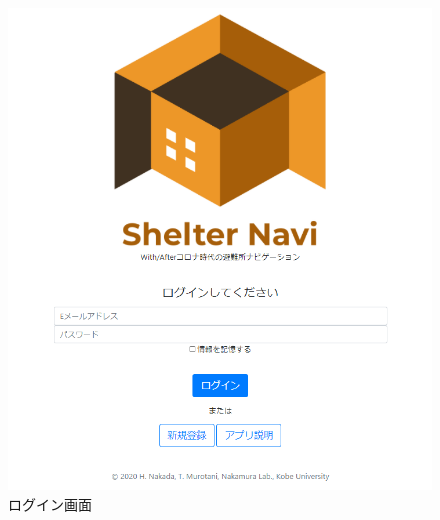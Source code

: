 \documentclass[technicalreport,dvipdfmx]{ieicej}
\begin{document}
\begin{figure}[htbp]
     \begin{center}
          \includegraphics[scale=0.5,pagebox=cropbox,clip]{login.png}
          \caption{ログイン画面}
          \label{fig:login}
     \end{center}
\end{figure}
\end{document}
